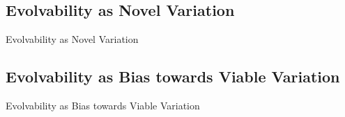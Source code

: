 

\subsection{Evolvability as Novel Variation}

\begin{frame}{Evolvability as Novel Variation}
	
\end{frame}

\subsection{Evolvability as Bias towards Viable Variation}

\begin{frame}{Evolvability as Bias towards Viable Variation}
  
\end{frame}

